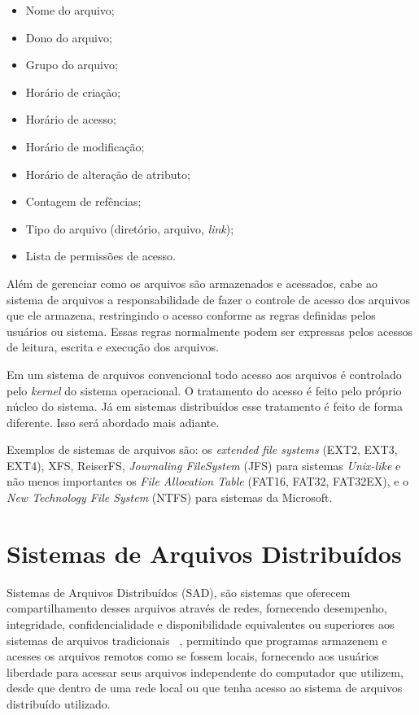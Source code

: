     \begin{itemize}
        \item Nome do arquivo;
        \item Dono do arquivo;
        \item Grupo do arquivo;
        \item Horário de criação;
        \item Horário de acesso;
        \item Horário de modificação;
        \item Horário de alteração de atributo;
        \item Contagem de refências;
        \item Tipo do arquivo (diretório, arquivo, \textit{link});
        \item Lista de permissões de acesso.
    \end{itemize}
    
    Além de gerenciar como os arquivos são armazenados e acessados, cabe ao sistema de arquivos a responsabilidade de fazer o controle de acesso dos arquivos que ele armazena, restringindo o acesso conforme as regras definidas pelos usuários ou sistema. Essas regras normalmente podem ser expressas pelos acessos de leitura, escrita e execução dos arquivos.
    
    Em um sistema de arquivos convencional todo acesso aos arquivos é controlado pelo \textit{kernel} do sistema operacional. O tratamento do acesso é feito pelo próprio núcleo do sistema. Já em sistemas distribuídos esse tratamento é feito de forma diferente. Isso será abordado mais adiante.
    
    Exemplos de sistemas de arquivos são: os \textit{extended file systems} (EXT2, EXT3, EXT4), XFS, ReiserFS, \textit{Journaling FileSystem} (JFS) para sistemas \textit{Unix-like} e não menos importantes os \textit{File Allocation Table} (FAT16, FAT32, FAT32EX), e o \textit{New Technology File System} (NTFS) para sistemas da Microsoft.


\section{Sistemas de Arquivos Distribuídos}

	 Sistemas de Arquivos Distribuídos (SAD), são sistemas que oferecem compartilhamento desses arquivos através de redes, fornecendo desempenho, integridade, confidencialidade e disponibilidade equivalentes ou superiores aos sistemas de arquivos tradicionais ~\cite{coulouris}, permitindo que programas armazenem e acesses os arquivos remotos como se fossem locais, fornecendo aos usuários liberdade para acessar seus arquivos independente do computador que utilizem, desde que dentro de uma rede local ou que tenha acesso ao sistema de arquivos distribuído utilizado.
	 

